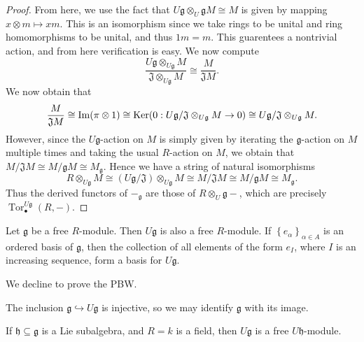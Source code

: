 \begin{proof}
	From here, we use the fact that $U\mathfrak{g} \otimes_U\mathfrak{g} M\cong M$ is given by mapping $x\otimes m\mapsto xm$. This is an isomorphism since we take rings to be unital and ring homomorphisms to be unital, and thus $1m=m$. This guarentees a nontrivial action, and from here verification is easy. We now compute
	\[
		\frac{U\mathfrak{g} \otimes _{U\mathfrak{g} } M}{\mathfrak{J} \otimes _{U\mathfrak{g} } M} \cong \frac{M}{\mathfrak{J} M} 
	.\]
	We now obtain that
	\[
		\frac{M}{\mathfrak{J} M} \cong \operatorname{Im} (\pi \otimes 1)\cong \operatorname{Ker} (0: U\mathfrak{g} /\mathfrak{J} \otimes _{U\mathfrak{g} } M\to 0) \cong U\mathfrak{g} /\mathfrak{J} \otimes _{U\mathfrak{g} } M
	.\]
	However, since the $U\mathfrak{g} $-action on $M$ is simply given by iterating the $\mathfrak{g} $-action on $M$ multiple times and taking the usual $R$-action on $M$, we obtain that $M/\mathfrak{J} M \cong M/\mathfrak{g} M\cong M_\mathfrak{g} $. Hence we have a string of natural isomorphisms
	\[
		R\otimes_{U\mathfrak{g} } M \cong (U\mathfrak{g} /\mathfrak{J} )\otimes _{U\mathfrak{g} } M \cong M / \mathfrak{J} M \cong M / \mathfrak{g} M \cong M_\mathfrak{g} 
	.\]
	Thus the derived functors of $-_\mathfrak{g} $ are those of $R\otimes _U\mathfrak{g} -$, which are precisely $\operatorname{Tor}_{\bullet} ^{U\mathfrak{g} } (R,-)$.
\end{proof}

\begin{theorem}\label{7.3.4}
	Let $\mathfrak{g} $ be a free $R$-module. Then $U\mathfrak{g} $ is also a free $R$-module. If $\left\{ e_\alpha  \right\} _{\alpha \in A} $ is an ordered basis of $\mathfrak{g} $, then the collection of all elements of the form $e_I$, where $I$ is an increasing sequence, form a basis for $U\mathfrak{g} $.
\end{theorem}
We decline to prove the PBW.
\begin{corollary}\label{7.3.5}
	The inclusion $\mathfrak{g} \hookrightarrow U\mathfrak{g} $ is injective, so we may identify $\mathfrak{g} $ with its image.
\end{corollary}
\begin{corollary}\label{7.3.6}
	If $\mathfrak{h} \subseteq \mathfrak{g} $ is a Lie subalgebra, and $R=k$ is a field, then $U\mathfrak{g} $ is a free $U\mathfrak{h} $-module.
\end{corollary}

